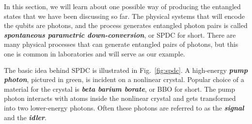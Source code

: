 In this section, we will learn about one possible way of producing the entangled states that we have been discussing so far.
The physical systems that will encode the qubits are photons, and the process generates entangled photon pairs is called \textbf{\emph{spontaneous parametric down-conversion}}, or SPDC for short. There are many physical processes that can generate entangled pairs of photons, but this one is common in laboratories and will serve as our example.

The basic idea behind SPDC is illustrated in Fig.~\ref{fig:spdc}.
A high-energy \textbf{\emph{pump photon}}, pictured in green, is incident on a nonlinear crystal.
Popular choice of a material for the crystal is \textbf{\emph{beta barium borate}}, or BBO for short.
The pump photon interacts with atoms inside the nonlinear crystal and gets transformed into two lower-energy photons.
Often these photons are referred to as the \textbf{\emph{signal}} and the \textbf{\emph{idler}}.

